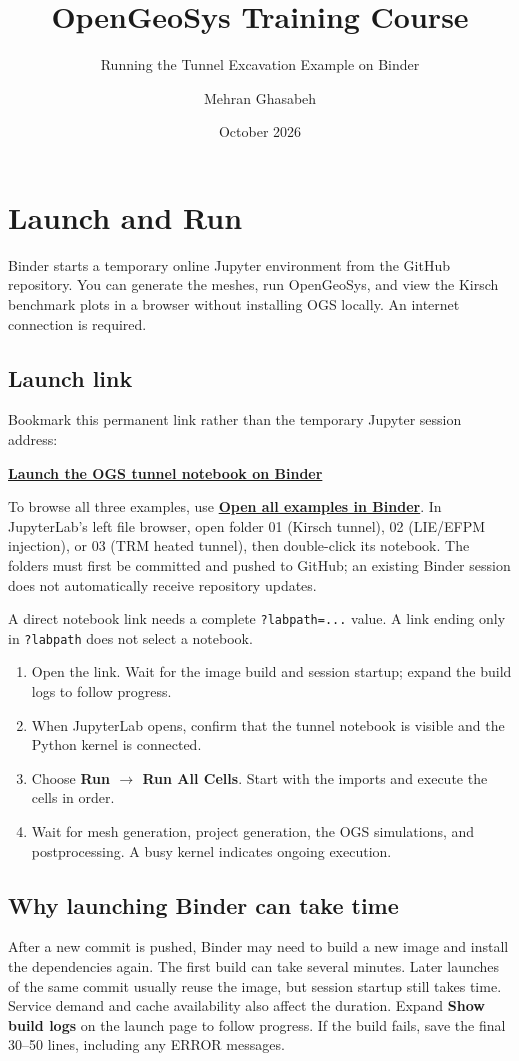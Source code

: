 \documentclass[11pt,a4paper]{tubaf-report}
\title[OGS on Binder]{OpenGeoSys Training Course}
\subtitle{Running the Tunnel Excavation Example on Binder}
\author[Mehran Ghasabeh]{Mehran Ghasabeh}
\date{October 2026}
\begin{document}
\maketitle
\tableofcontents
\clearpage
\chapter{Launch and Run}
Binder starts a temporary online Jupyter environment from the GitHub repository. You can generate the meshes, run OpenGeoSys, and view the Kirsch benchmark plots in a browser without installing OGS locally. An internet connection is required.
\section{Launch link}
Bookmark this permanent link rather than the temporary Jupyter session address:
\begin{center}
\href{https://mybinder.org/v2/gh/mehranqsb/ogs-binder/main?labpath=01_Tunnel_Excavation_Kirsch\%2F01_tunnel_excavation_kirsch.ipynb}{\textbf{Launch the OGS tunnel notebook on Binder}}
\end{center}
To browse all three examples, use
\href{https://mybinder.org/v2/gh/mehranqsb/ogs-binder/main}{\textbf{Open all examples in Binder}}.
In JupyterLab's left file browser, open folder 01 (Kirsch tunnel),
02 (LIE/EFPM injection), or 03 (TRM heated tunnel), then double-click its notebook.
The folders must first be committed and pushed to GitHub; an existing Binder
session does not automatically receive repository updates.

A direct notebook link needs a complete \texttt{?labpath=...} value.
A link ending only in \texttt{?labpath} does not select a notebook.
\begin{enumerate}
\item Open the link. Wait for the image build and session startup; expand the build logs to follow progress.
\item When JupyterLab opens, confirm that the tunnel notebook is visible and the Python kernel is connected.
\item Choose \textbf{Run $\rightarrow$ Run All Cells}. Start with the imports and execute the cells in order.
\item Wait for mesh generation, project generation, the OGS simulations, and postprocessing. A busy kernel indicates ongoing execution.
\end{enumerate}
\section{Why launching Binder can take time}
After a new commit is pushed, Binder may need to build a new image and install
the dependencies again. The first build can take several minutes. Later
launches of the same commit usually reuse the image, but session startup still
takes time. Service demand and cache availability also affect the duration.
Expand \textbf{Show build logs} on the launch page to follow progress. If the
build fails, save the final 30--50 lines, including any ERROR messages.
\end{document}
